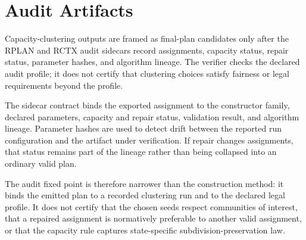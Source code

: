 \section{Audit Artifacts}

Capacity-clustering outputs are framed as final-plan candidates only after the
RPLAN and RCTX audit sidecars record assignments, capacity status, repair status,
parameter hashes, and algorithm lineage. The verifier checks the declared audit
profile; it does not certify that clustering choices satisfy fairness or legal
requirements beyond the profile.

The sidecar contract binds the exported assignment to the constructor family,
declared parameters, capacity and repair status, validation result, and
algorithm lineage. Parameter hashes are used to detect drift between the
reported run configuration and the artifact under verification. If repair
changes assignments, that status remains part of the lineage rather than being
collapsed into an ordinary valid plan.

The audit fixed point is therefore narrower than the construction method: it
binds the emitted plan to a recorded clustering run and to the declared legal
profile. It does not certify that the chosen seeds respect communities of
interest, that a repaired assignment is normatively preferable to another
valid assignment, or that the capacity rule captures state-specific
subdivision-preservation law.
